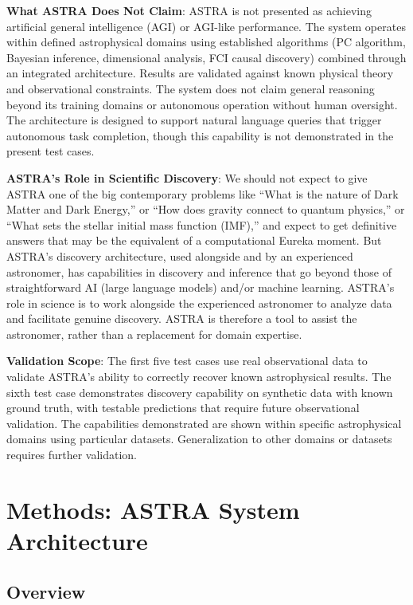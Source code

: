 \documentclass[usenatbib]{rasti}
\begin{document}
\textbf{What ASTRA Does Not Claim}: ASTRA is not presented as achieving artificial general intelligence (AGI) or AGI-like performance. The system operates within defined astrophysical domains using established algorithms (PC algorithm, Bayesian inference, dimensional analysis, FCI causal discovery) combined through an integrated architecture. Results are validated against known physical theory and observational constraints. The system does not claim general reasoning beyond its training domains or autonomous operation without human oversight. The architecture is designed to support natural language queries that trigger autonomous task completion, though this capability is not demonstrated in the present test cases.

\textbf{ASTRA's Role in Scientific Discovery}: We should not expect to give ASTRA one of the big contemporary problems like ``What is the nature of Dark Matter and Dark Energy,'' or ``How does gravity connect to quantum physics,'' or ``What sets the stellar initial mass function (IMF),'' and expect to get definitive answers that may be the equivalent of a computational Eureka moment. But ASTRA's discovery architecture, used alongside and by an experienced astronomer, has capabilities in discovery and inference that go beyond those of straightforward AI (large language models) and/or machine learning. ASTRA's role in science is to work alongside the experienced astronomer to analyze data and facilitate genuine discovery. ASTRA is therefore a tool to assist the astronomer, rather than a replacement for domain expertise.

\textbf{Validation Scope}: The first five test cases use real observational data to validate ASTRA's ability to correctly recover known astrophysical results. The sixth test case demonstrates discovery capability on synthetic data with known ground truth, with testable predictions that require future observational validation. The capabilities demonstrated are shown within specific astrophysical domains using particular datasets. Generalization to other domains or datasets requires further validation.

\section{Methods: ASTRA System Architecture}

\subsection{Overview}
\end{document}

